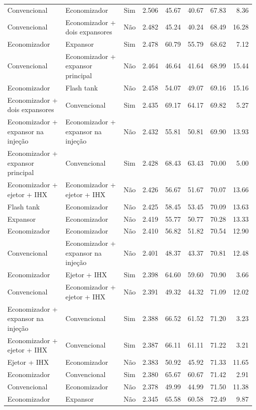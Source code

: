 {\begin{tabular}{llcrrrrr}
Convencional & Economizador & Sim & 2.506 & 45.67 & 40.67 & 67.83 & 8.36 \\
Convencional & Economizador + dois expansores & Não & 2.482 & 45.24 & 40.24 & 68.49 & 16.28 \\
Economizador & Expansor & Sim & 2.478 & 60.79 & 55.79 & 68.62 & 7.12 \\
Convencional & Economizador + expansor principal & Não & 2.464 & 46.64 & 41.64 & 68.99 & 15.44 \\
Economizador & Flash tank & Não & 2.458 & 54.07 & 49.07 & 69.16 & 15.16 \\
Economizador + dois expansores & Convencional & Sim & 2.435 & 69.17 & 64.17 & 69.82 & 5.27 \\
Economizador + expansor na injeção & Economizador + expansor na injeção & Não & 2.432 & 55.81 & 50.81 & 69.90 & 13.93 \\
Economizador + expansor principal & Convencional & Sim & 2.428 & 68.43 & 63.43 & 70.00 & 5.00 \\
Economizador + ejetor + IHX & Economizador + ejetor + IHX & Não & 2.426 & 56.67 & 51.67 & 70.07 & 13.66 \\
Flash tank & Economizador & Não & 2.425 & 58.45 & 53.45 & 70.09 & 13.63 \\
Expansor & Economizador & Não & 2.419 & 55.77 & 50.77 & 70.28 & 13.33 \\
Economizador & Economizador & Não & 2.410 & 56.82 & 51.82 & 70.54 & 12.90 \\
Convencional & Economizador + expansor na injeção & Não & 2.401 & 48.37 & 43.37 & 70.81 & 12.48 \\
Economizador & Ejetor + IHX & Sim & 2.398 & 64.60 & 59.60 & 70.90 & 3.66 \\
Convencional & Economizador + ejetor + IHX & Não & 2.391 & 49.32 & 44.32 & 71.09 & 12.02 \\
Economizador + expansor na injeção & Convencional & Sim & 2.388 & 66.52 & 61.52 & 71.20 & 3.23 \\
Economizador + ejetor + IHX & Convencional & Sim & 2.387 & 66.11 & 61.11 & 71.22 & 3.21 \\
Ejetor + IHX & Economizador & Não & 2.383 & 50.92 & 45.92 & 71.33 & 11.65 \\
Economizador & Convencional & Sim & 2.380 & 65.67 & 60.67 & 71.42 & 2.91 \\
Convencional & Economizador & Não & 2.378 & 49.99 & 44.99 & 71.50 & 11.38 \\
Economizador & Expansor & Não & 2.345 & 65.58 & 60.58 & 72.49 & 9.87 \\

\end{tabular}}
